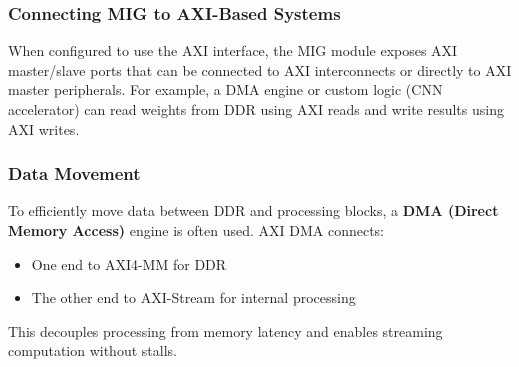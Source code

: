 \documentclass{article}
\begin{document}
\subsubsection*{Connecting MIG to AXI-Based Systems}

When configured to use the AXI interface, the MIG module exposes AXI master/slave ports that can be connected to AXI interconnects or directly to AXI master peripherals. For example, a DMA engine or custom logic (CNN accelerator) can read weights from DDR using AXI reads and write results using AXI writes.


\subsubsection*{Data Movement}

To efficiently move data between DDR and processing blocks, a \textbf{DMA (Direct Memory Access)} engine is often used. AXI DMA connects:
\begin{itemize}
  \item One end to AXI4-MM for DDR
  \item The other end to AXI-Stream for internal processing
\end{itemize}

This decouples processing from memory latency and enables streaming computation without stalls.
\end{document}

